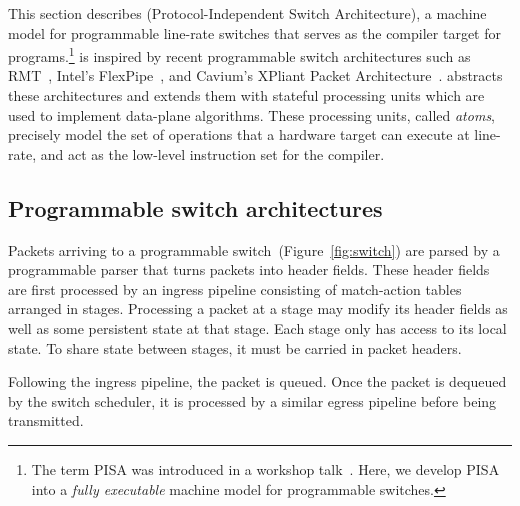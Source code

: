 This section describes \absmachine (Protocol-Independent Switch
Architecture), a machine model for programmable line-rate switches
that serves as the compiler target for \pktlanguage
programs.\footnote{The term PISA was introduced in a workshop
  talk~\cite{nick_p4}.  Here, we develop PISA into a \textit{fully
    executable} machine model for programmable switches.}  \absmachine is inspired by recent programmable
switch architectures such as RMT~\cite{rmt}, Intel's
FlexPipe~\cite{flexpipe}, and Cavium's XPliant Packet
Architecture~\cite{xpliant}. \absmachine abstracts these architectures
and extends them with stateful processing units which are used to
implement data-plane algorithms. These processing units, called {\em
  atoms}, precisely model the set of operations that a hardware target
can execute at line-rate, and act as the low-level instruction set for
the \pktlanguage compiler.





\subsection{Programmable switch architectures}
Packets arriving to a programmable switch~(Figure~\ref{fig:switch})
are parsed by a programmable parser that turns packets into header
fields. These header fields are first processed by an ingress pipeline
consisting of match-action tables arranged in stages. Processing a
packet at a stage may modify its header fields as well as some
persistent state at that stage. Each stage only has access to its
local state. To share state between stages, it must be carried in
packet headers.

Following the ingress pipeline, the packet is queued. Once the packet
is dequeued by the switch scheduler, it is processed by a similar
egress pipeline before being transmitted.

